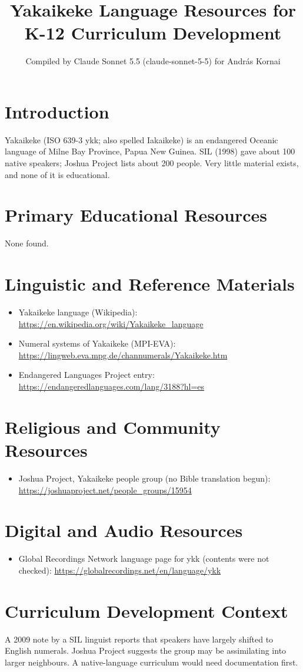 \documentclass[12pt]{article}
\title{Yakaikeke Language Resources for K-12 Curriculum Development}
\author{Compiled by Claude Sonnet 5.5 (claude-sonnet-5-5) for Andr\'as Kornai}
\date{}
\begin{document}
\maketitle

\section{Introduction}
Yakaikeke (ISO 639-3 ykk; also spelled Iakaikeke) is an endangered Oceanic language of Milne Bay Province, Papua New Guinea. SIL (1998) gave about 100 native speakers; Joshua Project lists about 200 people. Very little material exists, and none of it is educational.

\section{Primary Educational Resources}
None found.

\section{Linguistic and Reference Materials}
\begin{itemize}
\item Yakaikeke language (Wikipedia): \url{https://en.wikipedia.org/wiki/Yakaikeke_language}
\item Numeral systems of Yakaikeke (MPI-EVA): \url{https://lingweb.eva.mpg.de/channumerals/Yakaikeke.htm}
\item Endangered Languages Project entry: \url{https://endangeredlanguages.com/lang/3188?hl=es}
\end{itemize}

\section{Religious and Community Resources}
\begin{itemize}
\item Joshua Project, Yakaikeke people group (no Bible translation begun): \url{https://joshuaproject.net/people_groups/15954}
\end{itemize}

\section{Digital and Audio Resources}
\begin{itemize}
\item Global Recordings Network language page for ykk (contents were not checked): \url{https://globalrecordings.net/en/language/ykk}
\end{itemize}

\section{Curriculum Development Context}
A 2009 note by a SIL linguist reports that speakers have largely shifted to English numerals. Joshua Project suggests the group may be assimilating into larger neighbours. A native-language curriculum would need documentation first.
\end{document}
